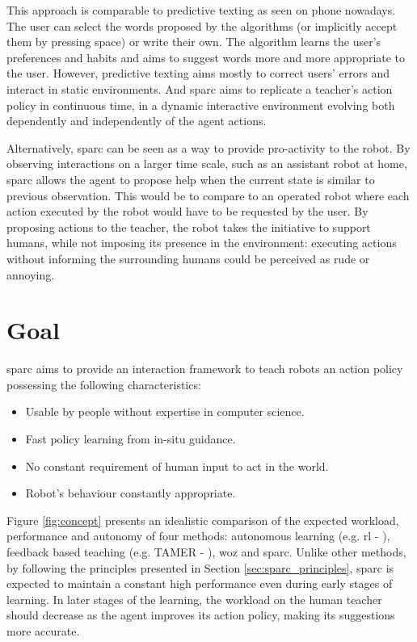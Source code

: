 This approach is comparable to predictive texting as seen on phone nowadays. The user can select the words proposed by the algorithms (or implicitly accept them by pressing space) or write their own. The algorithm learns the user's preferences and habits and aims to suggest words more and more appropriate to the user. However, predictive texting aims mostly to correct users' errors and interact in static environments. And \gls{sparc} aims to replicate a teacher's action policy in continuous time, in a dynamic interactive environment evolving both dependently and independently of the agent actions.

Alternatively, \gls{sparc} can be seen as a way to provide pro-activity to the robot. By observing interactions on a larger time scale, such as an assistant robot at home, \gls{sparc} allows the agent to propose help when the current state is similar to previous observation. This would be to compare to an operated robot where each action executed by the robot would have to be requested by the user. By proposing actions to the teacher, the robot takes the initiative to support humans, while not imposing its presence in the environment: executing actions without informing the surrounding humans could be perceived as rude or annoying.

\section{Goal}

\gls{sparc} aims to provide an interaction framework to teach robots an action policy possessing the following characteristics:
\begin{itemize}
	\item Usable by people without expertise in computer science.
	\item Fast policy learning from in-situ guidance.
	\item No constant requirement of human input to act in the world.
	\item Robot's behaviour constantly appropriate.
\end{itemize}

Figure \ref{fig:concept} presents an idealistic comparison of the expected workload, performance and autonomy of four methods: autonomous learning (e.g. \gls{rl} - \citealt{sutton1998reinforcement}), feedback based teaching (e.g. TAMER - \citealt{knox2009interactively}), \gls{woz} and \gls{sparc}. Unlike other methods, by following the principles presented in Section \ref{sec:sparc_principles}, \gls{sparc} is expected to maintain a constant high performance even during early stages of learning. In later stages of the learning, the workload on the human teacher should decrease as the agent improves its action policy, making its suggestions more accurate.


